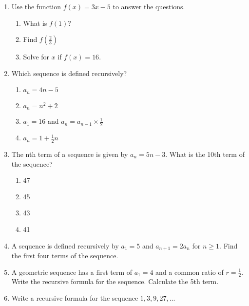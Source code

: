 \documentclass[12pt, twoside]{article}
\begin{document}
\begin{enumerate}[itemsep=0.5cm]
\item Use the function $f(x) = 3x-5$ to answer the questions.
  \begin{multicols}{2}
  \begin{enumerate}[itemsep=2cm]
      \item What is $f(1)$?
      \item Find $f(\frac{2}{3})$
      \item Solve for $x$ if $f(x) = 16$.
  \end{enumerate}
  \end{multicols} \vspace{1cm}

\newpage

\item Which sequence is defined recursively?
\begin{enumerate}
    \item $a_n = 4n - 5$
    \item $a_n = n^2 + 2$
    \item $a_1 = 16$ and $a_n = a_{n-1} \times \frac{1}{2}$
    \item $a_n = 1 + \frac{1}{2}n$
\end{enumerate}


\item The nth term of a sequence is given by $a_n = 5n - 3$. What is the 10th term of the sequence?
\begin{enumerate}
    \item 47
    \item 45
    \item 43
    \item 41
\end{enumerate}

\item A sequence is defined recursively by $ a_1 = 5 $ and $ a_{n+1} = 2a_n$ for $ n \geq 1 $. Find the first four terms of the sequence. \vspace{2cm}

\item A geometric sequence has a first term of $a_1 = 4$ and a common ratio of $r = \frac{1}{2}$. Write the recursive formula for the sequence. Calculate the 5th term. \vspace{4cm}

\item Write a recursive formula for the sequence $1, 3, 9, 27, \dots$ \vspace{2cm}



\end{enumerate}
\end{document}
